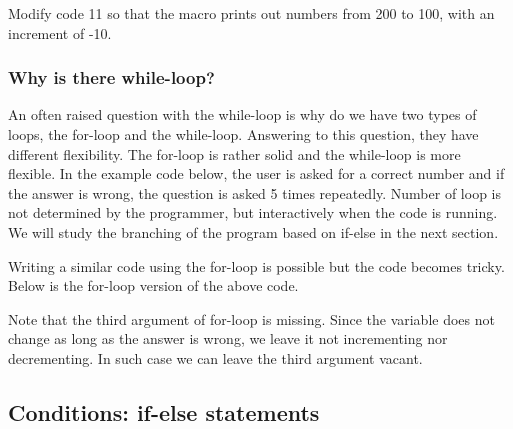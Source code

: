 \begin{indentexercise}{3}
Modify code 11 so that the macro prints out numbers from 200 to 100, with an increment of -10. 
\end{indentexercise}

\subsubsection{Why is there while-loop?}

An often raised question with the while-loop is why do we have two types of loops, 
the for-loop and the while-loop. Answering to this question, they have different
flexibility. The for-loop is rather solid and the while-loop is more flexible. In the
example code below, the user is asked for a correct number and if the answer is wrong, the
question is asked 5 times repeatedly. Number of loop is not determined by the
programmer, but interactively when the code is running. We will study
the branching of the program based on if-else in the next section.  



Writing a similar code using the for-loop is possible but the code becomes tricky.
Below is the for-loop version of the above code.  



Note that the third argument of for-loop is missing. Since the variable
 does not change as long as the answer is wrong, we leave it not
incrementing nor decrementing. In such case we can leave the third argument
vacant. 

\subsection{Conditions: if-else statements}
